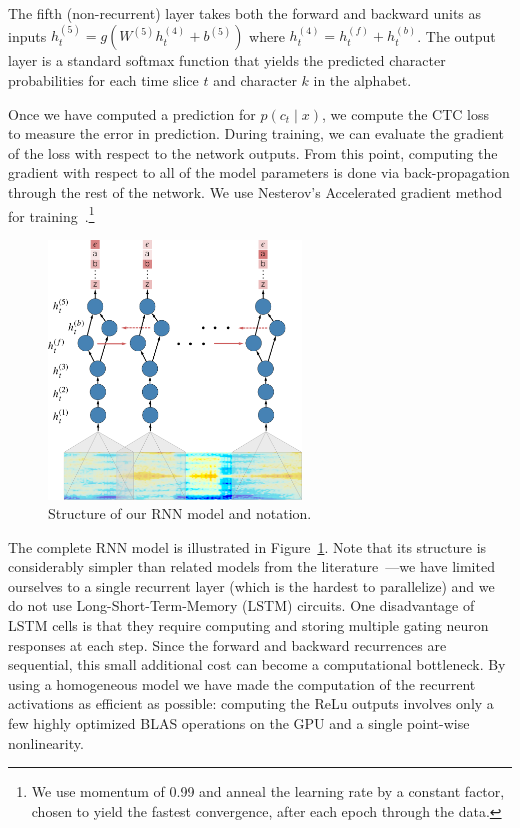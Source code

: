 The fifth (non-recurrent) layer takes both the forward and backward units as
inputs $h^{(5)}_t = g(W^{(5)} h^{(4)}_t + b^{(5)})$ where $h^{(4)}_t =
h^{(f)}_t + h^{(b)}_t$. The output layer is a standard softmax function that
yields the predicted character probabilities for each time slice $t$ and
character $k$ in the alphabet.

Once we have computed a prediction for $p(c_t \mid x)$, we compute the CTC
loss~\cite{graves2006} to measure the error in prediction. During training, we
can evaluate the gradient of the loss with respect to the network outputs. From
this point, computing the gradient with respect to all of the model parameters
is done via back-propagation through the rest of the network. We use Nesterov's
Accelerated gradient method for training~\cite{sutskever2013}.\footnote{We use
momentum of 0.99 and anneal the learning rate by a constant factor, chosen to
yield the fastest convergence, after each epoch through the data.}

\begin{figure}[th]
\centering
 \includegraphics[width=0.6\textwidth]{deepspeech/figures/speech_network.pdf}
  \caption{Structure of our RNN model and notation.}
  \label{fig:deepspeech:rnn}
\end{figure}

The complete RNN model is illustrated in Figure~\ref{fig:deepspeech:rnn}. Note
that its structure is considerably simpler than related models from the
literature~\cite{graves2014}---we have limited ourselves to a single recurrent
layer (which is the hardest to parallelize) and we do not use
Long-Short-Term-Memory (LSTM) circuits. One disadvantage of LSTM cells is that
they require computing and storing multiple gating neuron responses at each
step. Since the forward and backward recurrences are sequential, this small
additional cost can become a computational bottleneck. By using a homogeneous
model we have made the computation of the recurrent activations as efficient as
possible: computing the ReLu outputs involves only a few highly optimized BLAS
operations on the GPU and a single point-wise nonlinearity.

